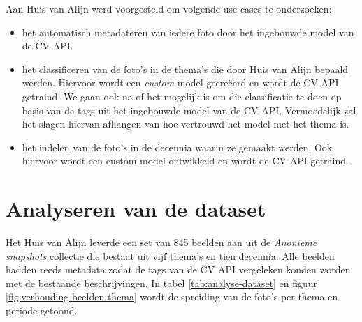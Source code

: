 Aan Huis van Alijn werd voorgesteld om volgende use cases te onderzoeken:
\begin{itemize}
	\item het automatisch metadateren van iedere foto door het ingebouwde model van de CV API.
	\item het classificeren van de foto’s in de thema’s die door Huis van Alijn bepaald werden. Hiervoor wordt een \textit{custom} model gecre\"{e}erd en wordt de CV API getraind. We gaan ook na of het mogelijk is om die classificatie te doen op basis van de tags uit het ingebouwde model van de CV API. Vermoedelijk zal het slagen hiervan afhangen van hoe vertrouwd het model met het thema is. 
	\item het indelen van de foto’s in de decennia waarin ze gemaakt werden. Ook hiervoor wordt een custom model ontwikkeld en wordt de CV API getraind.
\end{itemize}

\section{Analyseren van de dataset}
\label{sec:analyseren-van-de-dataset}

Het Huis van Alijn leverde een set van 845 beelden aan uit de \textit{Anonieme snapshots} collectie die bestaat uit vijf thema’s en tien decennia. Alle beelden hadden reeds metadata zodat de tags van de CV API vergeleken konden worden met de bestaande beschrijvingen. In tabel  \ref{tab:analyse-dataset} en figuur \ref{fig:verhouding-beelden-thema} wordt de spreiding van de foto’s per thema en periode getoond.

